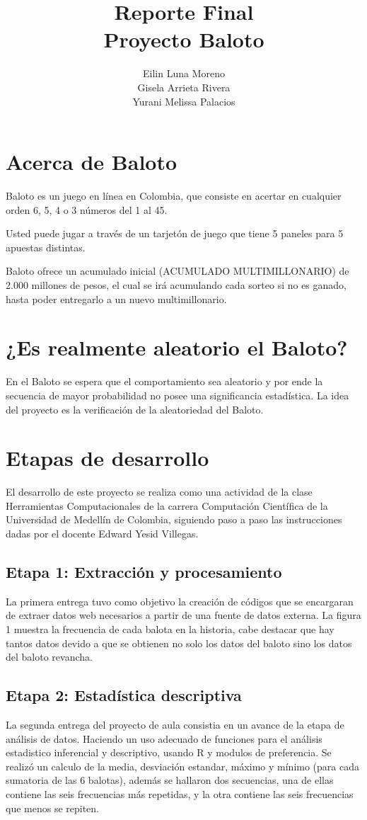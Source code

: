 \documentclass[11pt]{article}
\title{\textbf{Reporte Final \\ Proyecto Baloto }}
\author{Eilin Luna Moreno\\
		Gisela Arrieta Rivera\\
			Yurani Melissa Palacios }
\date{}
\begin{document}
\maketitle

\section{Acerca de Baloto}

Baloto es un juego en línea en Colombia, que consiste en acertar en cualquier orden 6, 5, 4 o 3 números del 1 al 45.
 
Usted puede jugar a través de un tarjetón de juego que tiene 5 paneles para 5 apuestas distintas.
 
Baloto ofrece un acumulado inicial (ACUMULADO MULTIMILLONARIO) de 2.000 millones de pesos, el cual se irá acumulando cada sorteo si no es ganado, hasta poder entregarlo a un nuevo multimillonario.

\section{¿Es realmente aleatorio el Baloto?}
En el Baloto se espera que el comportamiento sea aleatorio y por ende la secuencia de mayor probabilidad no posee una significancia estadística. La idea del proyecto es la verificación de la aleatoriedad del Baloto.

\section{Etapas de desarrollo}
El desarrollo de este proyecto se realiza como una actividad de la clase Herramientas Computacionales de la carrera Computación Científica de la Universidad de Medellín de Colombia, siguiendo paso a paso las instrucciones dadas por el docente Edward Yesid Villegas.

\subsection{Etapa 1: Extracción y procesamiento}
La primera entrega tuvo como objetivo la creación de códigos que se encargaran de extraer datos web necesarios a partir de una fuente de datos externa. La figura 1 muestra la frecuencia de cada balota en la historia, cabe destacar que hay tantos datos devido a que se obtienen no solo los datos del baloto sino los datos del baloto revancha.


\subsection{Etapa 2: Estadística descriptiva}
La segunda entrega del proyecto de aula consistia en un avance de la etapa de análisis de datos. Haciendo un uso adecuado de funciones para el análisis estadistico inferencial y descriptivo, usando R y modulos de preferencia. Se realizó un calculo de la media, desviación estandar, máximo y mínimo (para cada sumatoria de las 6 balotas), además se hallaron dos secuencias, una de ellas contiene las seis frecuencias más repetidas, y la otra contiene las seis frecuencias que menos se repiten.
\end{document}
